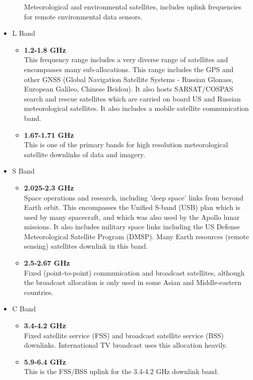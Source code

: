 \documentclass[12pt,a4paper]{report}
\begin{document}
\begin{itemize}
\begin{itemize}
	Meteorological and environmental satellites, includes uplink frequencies for remote environmental data sensors.
	\end{itemize}
\item L Band
	\begin{itemize}
	\item \textbf{1.2-1.8 GHz}
	\\This frequency range includes a very diverse range of satellites and encompasses many sub-allocations. This range includes the GPS and other GNSS (Global Navigation Satellite Systems - Russian Glonass, European Galileo, Chinese Beidou). It also hosts SARSAT/COSPAS search and rescue satellites which are carried on board US and Russian meteorological satellites. It also includes a mobile satellite communication band.
	\item \textbf{1.67-1.71 GHz}
	\\This is one of the primary bands for high resolution meteorological satellite downlinks of data and imagery.
	\end{itemize}
\item S Band
	\begin{itemize}
	\item \textbf{2.025-2.3 GHz}\\
	Space operations and research, including 'deep space' links from beyond Earth orbit. This encompasses the Unified S-band (USB) plan which is used by many spacecraft, and which was also used by the Apollo lunar missions. It also includes military space links including the US Defense Meteorological Satellite Program (DMSP). Many Earth resources (remote sensing) satellites downlink in this band.
	\item \textbf{2.5-2.67 GHz}\\
	Fixed (point-to-point) communication and broadcast satellites, although the broadcast allocation is only used in some Asian and Middle-eastern countries.
	\end{itemize}
\item C Band
	\begin{itemize}
	\item \textbf{3.4-4.2 GHz}\\
	Fixed satellite service (FSS) and broadcast satellite service (BSS) downlinks. International TV broadcast uses this allocation heavily.
	\item \textbf{5.9-6.4 GHz}\\
	This is the FSS/BSS uplink for the 3.4-4.2 GHz downlink band.
	\end{itemize}

\end{itemize}
\end{document}
